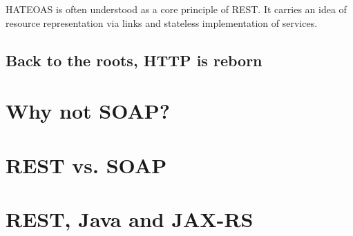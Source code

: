 	\gls{HATEOAS} is often understood as a core principle of \gls{REST}. It carries an idea of resource representation via
	links and stateless implementation of services.
	
	\subsection{Back to the roots, HTTP is reborn}
	
	\section{Why not SOAP?}
	
	\section{REST vs. SOAP}
	
	\section{REST, Java and JAX-RS}